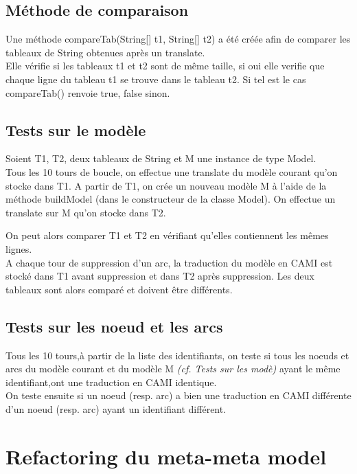 \documentclass{article}
\begin{document}
\subsection{M\'ethode de comparaison}
Une m\'ethode compareTab(String[] t1, String[] t2) a \'et\'e cr\'e\'ee
afin de comparer les tableaux de String obtenues apr\`es un translate.\\

Elle v\'erifie si les tableaux t1 et t2 sont de m\^eme taille, 
si oui elle verifie que chaque ligne du tableau t1 se trouve dans le tableau t2. 
Si tel est le cas compareTab() renvoie true, false sinon.

\subsection{Tests sur le mod\`ele}
Soient T1, T2, deux tableaux de String et M une instance de type Model.\\

Tous les 10 tours de boucle, on effectue une translate du mod\`ele courant qu'on stocke dans T1.
A partir de T1, on cr\'ee un nouveau mod\`ele M \`a l'aide de la m\'ethode buildModel 
(dans le constructeur de la classe Model).
On effectue un translate sur M qu'on stocke dans T2.

On peut alors comparer T1 et T2 en v\'erifiant qu'elles contiennent les m\^emes lignes.\\

A chaque tour de suppression d'un arc, la traduction du mod\`ele en CAMI est stock\'e 
dans T1 avant suppression et dans T2 apr\`es suppression.
Les deux tableaux sont alors compar\'e et doivent \^etre diff\'erents.

\subsection{Tests sur les noeud et les arcs}
Tous les 10 tours,\`a partir de la liste des identifiants, 
on teste si tous les noeuds et arcs du mod\`ele courant et du mod\`ele M
\textit{(cf. Tests sur les mod\`e)} ayant le m\^eme identifiant,ont une traduction en CAMI identique.\\

On teste ensuite si un noeud (resp. arc) a bien une traduction en CAMI diff\'erente
d'un noeud (resp. arc) ayant un identifiant diff\'erent.



\section{Refactoring du meta-meta model}
\end{document}
